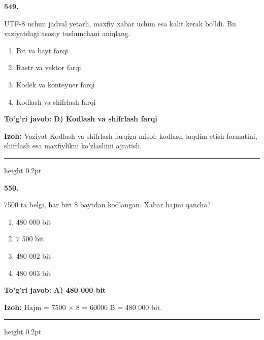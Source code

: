 \documentclass[10pt,a4paper,oneside]{article}
\begin{document}
\noindent\textbf{\color{ink}549.}
\par
UTF-8 uchun jadval yetarli, maxfiy xabar uchun esa kalit kerak bo'ldi. Bu vaziyatdagi asosiy tushunchani aniqlang.
\begin{enumerate}[label=\Alph*),leftmargin=9mm]
\item Bit va bayt farqi
\item Rastr va vektor farqi
\item Kodek va konteyner farqi
\item Kodlash va shifrlash farqi
\end{enumerate}
\begin{tcolorbox}[enhanced,breakable,colback=teal!4,colframe=teal!50!black,boxrule=0.5pt,arc=1.1mm,left=3mm,right=3mm,top=1.7mm,bottom=1.7mm,before skip=2mm,after skip=2mm]
\textbf{\color{teal}To'g'ri javob:} \textbf{D) Kodlash va shifrlash farqi}
\par\smallskip
\textbf{Izoh:} Vaziyat Kodlash va shifrlash farqiga misol: kodlash taqdim etish formatini, shifrlash esa maxfiylikni ko'zlashini ajratish.
\end{tcolorbox}
\vspace{2mm}\hrule height 0.2pt \vspace{3mm}

\noindent\textbf{\color{ink}550.}
\par
7500 ta belgi, har biri 8 baytdan kodlangan. Xabar hajmi qancha?
\begin{enumerate}[label=\Alph*),leftmargin=9mm]
\item 480 000 bit
\item 7 500 bit
\item 480 002 bit
\item 480 003 bit
\end{enumerate}
\begin{tcolorbox}[enhanced,breakable,colback=teal!4,colframe=teal!50!black,boxrule=0.5pt,arc=1.1mm,left=3mm,right=3mm,top=1.7mm,bottom=1.7mm,before skip=2mm,after skip=2mm]
\textbf{\color{teal}To'g'ri javob:} \textbf{A) 480 000 bit}
\par\smallskip
\textbf{Izoh:} Hajm = 7500 \ensuremath{\times} 8 = 60000 B = 480 000 bit.
\end{tcolorbox}
\vspace{2mm}\hrule height 0.2pt \vspace{3mm}
\end{document}
